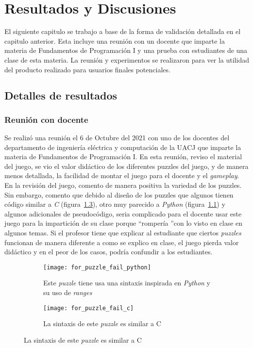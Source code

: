 \chapter{Resultados y Discusiones}
El siguiente capitulo se trabajo a base de la forma de validación detallada en el capitulo anterior. Esta incluye una reunión con un docente que imparte la materia de Fundamentos de Programación I y una prueba con estudiantes de una clase de esta materia. La reunión y experimentos se realizaron para ver la utilidad del producto realizado para usuarios finales potenciales.

\section{Detalles de resultados}
\subsection{Reunión con docente}
Se realizó una reunión el 6 de Octubre del 2021 con uno de los docentes del departamento de ingeniería eléctrica y computación de la UACJ que imparte la materia de Fundamentos de Programación I. En esta reunión, reviso el material del juego, se vio el valor didáctico de los diferentes puzzles del juego, y de manera menos detallada, la facilidad de montar el juego para el docente y el \textit{gameplay}. En la revisión del juego, comento de manera positiva la variedad de los puzzles. Sin embargo, comento que debido al diseño de los puzzles que algunos tienen código similar a \textit{C} (figura~\ref{fig:for_puzzle_fail_c}), otro muy parecido a \textit{Python} (figura~\ref{fig:for_puzzle_fail_python}) y algunos adicionales de pseudocódigo, seria complicado para el docente usar este juego para la impartición de su clase porque \textquotedblleft rompería \textquotedblright con lo visto en clase en algunos temas. Si el profesor tiene que explicar al estudiante que ciertos \textit{puzzles} funcionan de manera diferente a como se explico en clase, el juego pierda valor didáctico y en el peor de los casos, podría confundir a los estudiantes.
\begin{figure}
    \centering
    \begin{subfigure}{0.4\textwidth}
         \centering
         \texttt{[image: for\_puzzle\_fail\_python]}
         \caption{Este \textit{puzzle} tiene usa una sintaxis inspirada en \textit{Python} y su uso de \textit{ranges}}
         \label{fig:for_puzzle_fail_python}
     \end{subfigure}
         \begin{subfigure}{0.4\textwidth}
         \centering
         \texttt{[image: for\_puzzle\_fail\_c]}
         \caption{La sintaxis de este \textit{puzzle} es similar a C}
         \label{fig:for_puzzle_fail_c}
     \end{subfigure}
\end{figure}

